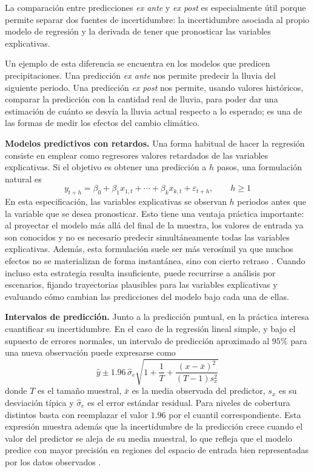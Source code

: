 \documentclass[12pt]{report} %
\begin{document}
La comparación entre predicciones \textit{ex ante} y \textit{ex post} es especialmente útil porque permite separar dos fuentes de incertidumbre: la incertidumbre asociada al propio modelo de regresión y la derivada de tener que pronosticar las variables explicativas.

Un ejemplo de esta diferencia se encuentra en los modelos que predicen precipitaciones. Una predicción \textit{ex ante} nos permite predecir la lluvia del siguiente periodo. Una predicción \textit{ex post} nos permite, usando valores históricos, comparar la predicción con la cantidad real de lluvia, para poder dar una estimación de cuánto se desvía la lluvia actual respecto a lo esperado; es una de las formas de medir los efectos del cambio climático.

\textbf{Modelos predictivos con retardos.} Una forma habitual de hacer la regresión consiste en emplear como regresores valores retardados de las variables explicativas. Si el objetivo es obtener una predicción a $h$ pasos, una formulación natural es
\begin{equation}
    y_{t+h} = \beta_0 + \beta_1 x_{1,t} + \cdots + \beta_k x_{k,t} + \varepsilon_{t+h},
    \qquad h \geq 1
    \label{eq:lagged_predictive_regression}
\end{equation}
En esta especificación, las variables explicativas se observan $h$ periodos antes que la variable que se desea pronosticar. Esto tiene una ventaja práctica importante: al proyectar el modelo más allá del final de la muestra, los valores de entrada ya son conocidos y no es necesario predecir simultáneamente todas las variables explicativas. Además, esta formulación suele ser más verosímil ya que muchos efectos no se materializan de forma instantánea, sino con cierto retraso \cite{Anderson1994}. Cuando incluso esta estrategia resulta insuficiente, puede recurrirse a análisis por escenarios, fijando trayectorias plausibles para las variables explicativas y evaluando cómo cambian las predicciones del modelo bajo cada una de ellas.

\textbf{Intervalos de predicción.} Junto a la predicción puntual, en la práctica interesa cuantificar su incertidumbre. En el caso de la regresión lineal simple, y bajo el supuesto de errores normales, un intervalo de predicción aproximado al $95\%$ para una nueva observación puede expresarse como
\begin{equation}
    \hat{y} \pm 1.96\,\hat{\sigma}_e\sqrt{1 + \frac{1}{T} + \frac{(x - \bar{x})^2}{(T-1)s_x^2}}
    \label{eq:simple_regression_prediction_interval}
\end{equation}
donde $T$ es el tamaño muestral, $\bar{x}$ es la media observada del predictor, $s_x$ es su desviación típica y $\hat{\sigma}_e$ es el error estándar residual. Para niveles de cobertura distintos basta con reemplazar el valor $1.96$ por el cuantil correspondiente. Esta expresión muestra además que la incertidumbre de la predicción crece cuando el valor del predictor se aleja de su media muestral, lo que refleja que el modelo predice con mayor precisión en regiones del espacio de entrada bien representadas por los datos observados \cite{Hyndman2021}.
\end{document}
